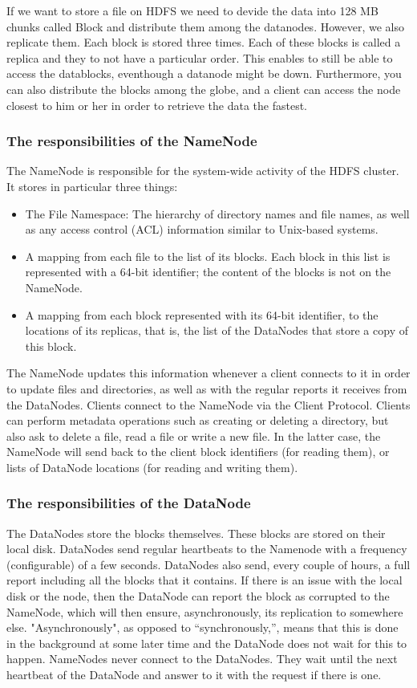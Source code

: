 If we want to store a file on HDFS we need to devide the data into 128 MB chunks called Block and distribute them among the datanodes. However, we also replicate them. Each block is stored three times. Each of these blocks is called a replica and they to not have a particular order. This enables to still be able to access the datablocks, eventhough a datanode might be down. Furthermore, you can also distribute the blocks among the globe, and a client can access the node closest to him or her in order to retrieve the data the fastest.

\subsubsection{The responsibilities of the NameNode}
The NameNode is responsible for the system-wide activity of the HDFS cluster. It stores in particular three things:
\begin{itemize}
    \item The File Namespace: The hierarchy of directory names and file names, as well as any access control (ACL) information similar to Unix-based systems.
    \item A mapping from each file to the list of its blocks. Each block in this list is represented with a 64-bit identifier; the content of the blocks is not on the NameNode.
    \item A mapping from each block represented with its 64-bit identifier, to the locations of its replicas, that is, the list of the DataNodes that store a copy of this block.
\end{itemize}
The NameNode updates this information whenever a client connects to it in order to update files and directories, as well as with the regular reports it receives from the DataNodes. Clients connect to the NameNode via the Client Protocol. Clients can perform metadata operations such as creating or deleting a directory, but also ask to delete a file, read a file or write a new file. In the latter case, the NameNode will send back to the client block identifiers (for reading them), or lists of DataNode locations (for reading and writing them).

\subsubsection{The responsibilities of the DataNode}
The DataNodes store the blocks themselves. These blocks are stored on their local disk.
DataNodes send regular heartbeats to the Namenode with a frequency (configurable) of a few seconds. DataNodes also send, every couple of hours, a full report including all the blocks that it contains.
If there is an issue with the local disk or the node, then the DataNode can report the block as corrupted to the NameNode, which will then ensure, asynchronously, its replication to somewhere else. "Asynchronously", as opposed to “synchronously,”, means that this is done in the background at some later time and the DataNode does not wait for this to happen.
NameNodes never connect to the DataNodes. They wait until the next heartbeat of the DataNode and answer to it with the request if there is one.

